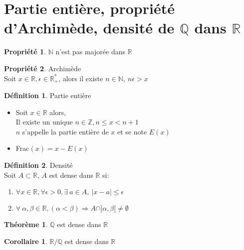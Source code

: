 \documentclass[fleqn]{article}
\theoremstyle{definition} \newtheorem*{defi}{D\'efinition}
\theoremstyle{definition} \newtheorem*{theo}{Th\'eor\`eme}
\theoremstyle{definition} \newtheorem*{coro}{Corollaire}
\theoremstyle{remark} \newtheorem*{rqs}{Remarques}
\theoremstyle{definition} \newtheorem*{prop}{Propri\'et\'e}
\begin{document}
\section{Partie entière, propri\'et\'e d'Archim\`ede, densit\'e de $\mathbb{Q}$ dans $\mathbb{R}$}
\begin{prop}
	$\mathbb{N}$ n'est pas major\'ee dans $\mathbb{R}$
\end{prop}
\begin{prop} Archim\`ede \\
	Soit $x \in \mathbb{R}, \epsilon \in \mathbb{R}_+^*$, alors il existe $n \in \mathbb{N},\ n\epsilon>x$
\end{prop}
\begin{defi} Partie enti\`ere
	\begin{itemize}
		\item Soit $x \in \mathbb{R}$ alors, \\
			Il existe un unique $n \in \mathbb{Z}, n \leq x < n+1$ \\
			$n$ s'appelle la partie enti\`ere de $x$ et se note $E(x)$
		\item Frac$(x) = x - E(x)$
	\end{itemize}
\end{defi}
\begin{defi} Densit\'e \\
	Soit $A \subset \mathbb{R}$, $A$ est dense dans $\mathbb{R}$ si:
	\begin{enumerate}
		\item $\forall x \in \mathbb{R}, \forall \epsilon > 0, \exists\ a \in A,\ |x-a| \leq \epsilon$
		\item $\forall\ \alpha,\beta \in \mathbb{R}, (\alpha < \beta) \Rightarrow A \cap ]\alpha, \beta[ \neq \emptyset$
	\end{enumerate}
	\begin{theo} $\mathbb{Q}$ est dense dans $\mathbb{R}$ \end{theo}
	\begin{coro} $\mathbb{R}/\mathbb{Q}$ est dense dans $\mathbb{R}$ \end{coro}
\end{defi}
\end{document}

